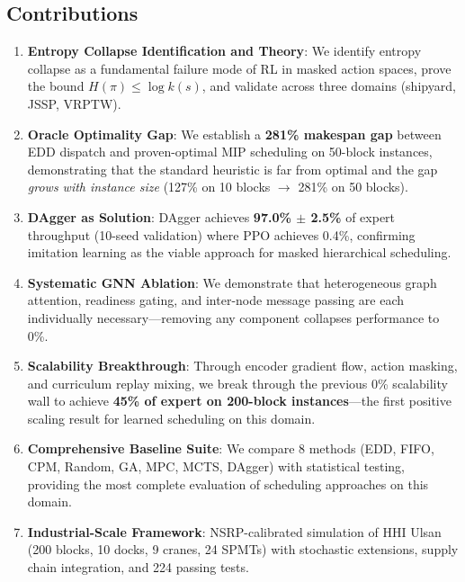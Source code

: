 \documentclass[11pt,a4paper]{article}
\begin{document}
\subsection{Contributions}

\begin{enumerate}
    \item \textbf{Entropy Collapse Identification and Theory}: We identify entropy collapse as a fundamental failure mode of RL in masked action spaces, prove the bound $H(\pi) \leq \log k(s)$, and validate across three domains (shipyard, JSSP, VRPTW).

    \item \textbf{Oracle Optimality Gap}: We establish a \textbf{281\% makespan gap} between EDD dispatch and proven-optimal MIP scheduling on 50-block instances, demonstrating that the standard heuristic is far from optimal and the gap \textit{grows with instance size} (127\% on 10 blocks $\to$ 281\% on 50 blocks).

    \item \textbf{DAgger as Solution}: DAgger achieves \textbf{97.0\% $\pm$ 2.5\%} of expert throughput (10-seed validation) where PPO achieves 0.4\%, confirming imitation learning as the viable approach for masked hierarchical scheduling.

    \item \textbf{Systematic GNN Ablation}: We demonstrate that heterogeneous graph attention, readiness gating, and inter-node message passing are each individually necessary---removing any component collapses performance to 0\%.

    \item \textbf{Scalability Breakthrough}: Through encoder gradient flow, action masking, and curriculum replay mixing, we break through the previous 0\% scalability wall to achieve \textbf{45\% of expert on 200-block instances}---the first positive scaling result for learned scheduling on this domain.

    \item \textbf{Comprehensive Baseline Suite}: We compare 8 methods (EDD, FIFO, CPM, Random, GA, MPC, MCTS, DAgger) with statistical testing, providing the most complete evaluation of scheduling approaches on this domain.

    \item \textbf{Industrial-Scale Framework}: NSRP-calibrated simulation of HHI Ulsan (200 blocks, 10 docks, 9 cranes, 24 SPMTs) with stochastic extensions, supply chain integration, and 224 passing tests.
\end{enumerate}
\end{document}
